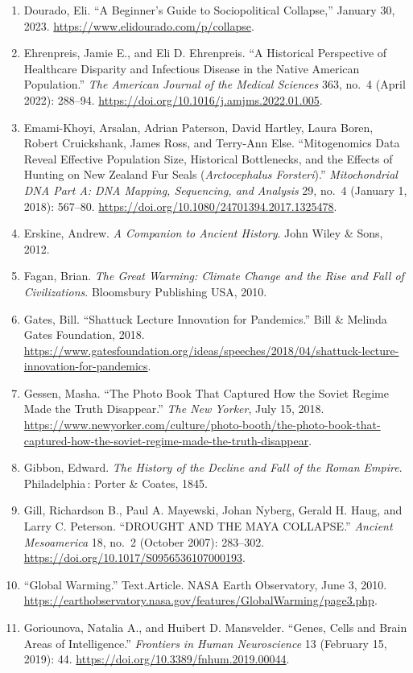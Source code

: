 \documentclass[12pt]{article}
\begin{document}
\begin{enumerate}[leftmargin=*]
\item Dourado, Eli. ``A Beginner’s Guide to Sociopolitical Collapse,'' January 30, 2023. \url{https://www.elidourado.com/p/collapse}.
\item Ehrenpreis, Jamie E., and Eli D. Ehrenpreis. ``A Historical Perspective of Healthcare Disparity and Infectious Disease in the Native American Population.'' \textit{The American Journal of the Medical Sciences} 363, no.\ 4 (April 2022): 288--94. \url{https://doi.org/10.1016/j.amjms.2022.01.005}.
\item Emami-Khoyi, Arsalan, Adrian Paterson, David Hartley, Laura Boren, Robert Cruickshank, James Ross, and Terry-Ann Else. ``Mitogenomics Data Reveal Effective Population Size, Historical Bottlenecks, and the Effects of Hunting on New Zealand Fur Seals (\textit{Arctocephalus Forsteri}).'' \textit{Mitochondrial DNA Part A: DNA Mapping, Sequencing, and Analysis} 29, no.\ 4 (January 1, 2018): 567--80. \url{https://doi.org/10.1080/24701394.2017.1325478}.
\item Erskine, Andrew. \textit{A Companion to Ancient History}. John Wiley \& Sons, 2012.
\item Fagan, Brian. \textit{The Great Warming: Climate Change and the Rise and Fall of Civilizations}. Bloomsbury Publishing USA, 2010.
\item Gates, Bill. ``Shattuck Lecture Innovation for Pandemics.'' Bill \& Melinda Gates Foundation, 2018. \url{https://www.gatesfoundation.org/ideas/speeches/2018/04/shattuck-lecture-innovation-for-pandemics}.
\item Gessen, Masha. ``The Photo Book That Captured How the Soviet Regime Made the Truth Disappear.'' \textit{The New Yorker}, July 15, 2018. \url{https://www.newyorker.com/culture/photo-booth/the-photo-book-that-captured-how-the-soviet-regime-made-the-truth-disappear}.
\item Gibbon, Edward. \textit{The History of the Decline and Fall of the Roman Empire}. Philadelphia\,: Porter \& Coates, 1845.
\item Gill, Richardson B., Paul A. Mayewski, Johan Nyberg, Gerald H. Haug, and Larry C. Peterson. ``DROUGHT AND THE MAYA COLLAPSE.'' \textit{Ancient Mesoamerica} 18, no.\ 2 (October 2007): 283--302. \url{https://doi.org/10.1017/S0956536107000193}.
\item ``Global Warming.'' Text.Article. NASA Earth Observatory, June 3, 2010. \url{https://earthobservatory.nasa.gov/features/GlobalWarming/page3.php}.
\item Goriounova, Natalia A., and Huibert D. Mansvelder. ``Genes, Cells and Brain Areas of Intelligence.'' \textit{Frontiers in Human Neuroscience} 13 (February 15, 2019): 44. \url{https://doi.org/10.3389/fnhum.2019.00044}.

\end{enumerate}
\end{document}

